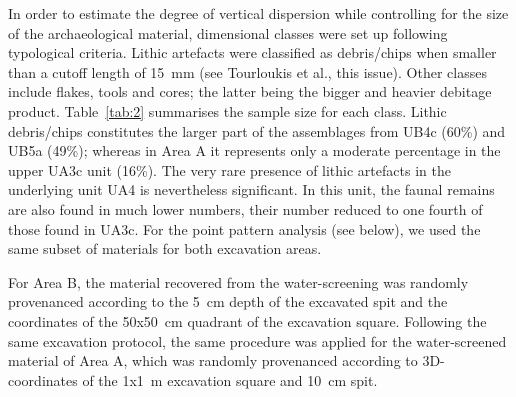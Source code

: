 \documentclass[review,authoryear,times]{elsarticle} %
\begin{document}
In order to estimate the degree of vertical dispersion while controlling for the size of the archaeological material, dimensional classes were set up following typological criteria. Lithic artefacts were classified as debris/chips when smaller than a cutoff length of 15~mm (see Tourloukis et al., this issue). Other classes include flakes, tools and cores; the latter being the bigger and heavier debitage product. Table~\ref{tab:2} summarises the sample size for each class. Lithic debris/chips constitutes the larger part of the assemblages from UB4c (60\%) and UB5a (49\%); whereas in Area A it represents only a moderate percentage in the upper UA3c unit (16\%). The very rare presence of lithic artefacts in the underlying unit UA4 is nevertheless significant. In this unit, the faunal remains are also found in much lower numbers, their number reduced to one fourth of those found in UA3c. For the point pattern analysis (see below), we used the same subset of materials for both excavation areas.

\begin{table}[]
  \caption{List of sampled observations for the vertical distribution and point pattern analyses.}
  \label{tab:2}
  \vspace{0.1in}
\end{table}

For Area B, the material recovered from the water-screening was randomly provenanced according to the 5~cm depth of the excavated spit and the coordinates of the 50x50~cm quadrant of the excavation square. Following the same excavation protocol, the same procedure was applied for the water-screened material of Area A, which was randomly provenanced according to 3D-coordinates of the 1x1~m excavation square and 10~cm spit.
\end{document}
